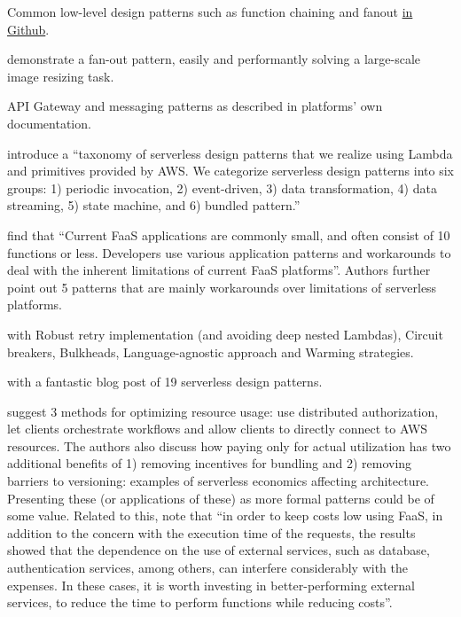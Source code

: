 Common low-level design patterns such as function chaining and fanout \href{https://github.com/yochay/serverlesspatterns}{in Github}.

\textcite{mcgrath16cloudEventParadigms} demonstrate a fan-out pattern, easily and performantly solving a large-scale image resizing task.

API Gateway and messaging patterns as described in platforms' own documentation. \parencite{awslambda0218}

\textcite{hong18securingviaserverlesspatterns} introduce a ``taxonomy of serverless design patterns that we realize using Lambda and primitives provided by AWS. We categorize serverless design patterns into six groups: 1) periodic invocation, 2) event-driven, 3) data transformation, 4) data streaming, 5) state machine, and 6) bundled pattern.''

\textcite{leitner18industrialpractice} find that ``Current FaaS applications are commonly small, and often consist of 10 functions or less. Developers use various application patterns and workarounds to deal with the inherent limitations of current FaaS platforms''. Authors further point out 5 patterns that are mainly workarounds over limitations of serverless platforms.

\textcite{bardsley18optimizationStrategies} with Robust retry implementation (and avoiding deep nested Lambdas), Circuit breakers, Bulkheads, Language-agnostic approach and Warming strategies.

\textcite{daly18blogPatterns} with a fantastic blog post of 19 serverless design patterns.

\textcite{adzic2017serverless} suggest 3 methods for optimizing resource usage: use distributed authorization, let clients orchestrate workflows and allow clients to directly connect to AWS resources. The authors also discuss how paying only for actual utilization has two additional benefits of 1) removing incentives for bundling and 2) removing barriers to versioning: examples of serverless economics affecting architecture. Presenting these (or applications of these) as more formal patterns could be of some value. Related to this, \textcite{albuquerque17faaspaas} note that ``in order to keep costs low using FaaS, in addition to the concern with the execution time of the requests, the results showed that the dependence on the use of external services, such as database, authentication services, among others, can interfere considerably with the expenses. In these cases, it is worth investing in better-performing external services, to reduce the time to perform functions while reducing costs''.


